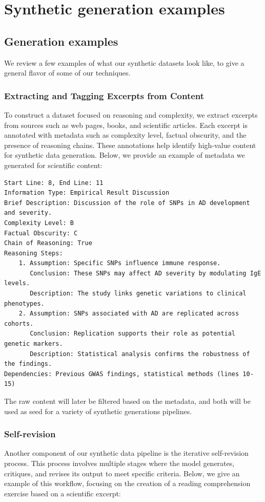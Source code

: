 \documentclass[11pt]{article}
\begin{document}
\section{Synthetic generation examples} \label{app:synthexamples}
\subsection{Generation examples}
We review a few examples of what our synthetic datasets look like, to give a general flavor of some of our techniques.

\subsubsection{Extracting and Tagging Excerpts from Content}
To construct a dataset focused on reasoning and complexity, we extract excerpts from sources such as web pages, books, and scientific articles. Each excerpt is annotated with metadata such as complexity level, factual obscurity, and the presence of reasoning chains. These annotations help identify high-value content for synthetic data generation. Below, we provide an example of metadata we generated for scientific content:
{\small
\begin{verbatim}
Start Line: 8, End Line: 11
Information Type: Empirical Result Discussion
Brief Description: Discussion of the role of SNPs in AD development and severity.
Complexity Level: B
Factual Obscurity: C
Chain of Reasoning: True
Reasoning Steps:
    1. Assumption: Specific SNPs influence immune response.
       Conclusion: These SNPs may affect AD severity by modulating IgE levels.
       Description: The study links genetic variations to clinical phenotypes.
    2. Assumption: SNPs associated with AD are replicated across cohorts.
       Conclusion: Replication supports their role as potential genetic markers.
       Description: Statistical analysis confirms the robustness of the findings.
Dependencies: Previous GWAS findings, statistical methods (lines 10-15)
\end{verbatim}
}
\noindent The raw content will later be filtered based on the metadata, and both will be used as seed for a variety of synthetic generations pipelines.

\subsubsection{Self-revision}

Another component of our synthetic data pipeline is the iterative self-revision process. This process involves multiple stages where the model generates, critiques, and revises its output to meet specific criteria. Below, we give an example of this workflow, focusing on the creation of a reading comprehension exercise based on a scientific excerpt:
\end{document}
